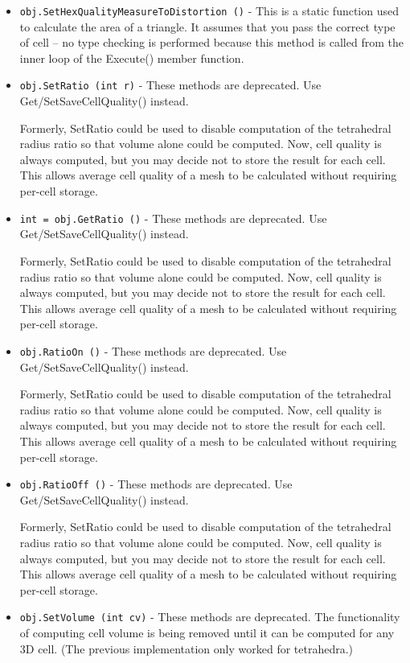 \begin{itemize}
\item  \verb|obj.SetHexQualityMeasureToDistortion ()| -  This is a static function used to calculate the area of a triangle.
 It assumes that you pass the correct type of cell -- no type checking is
 performed because this method is called from the inner loop of the Execute()
 member function.

\item  \verb|obj.SetRatio (int r)| -  These methods are deprecated. Use Get/SetSaveCellQuality() instead.

 Formerly, SetRatio could be used to disable computation
 of the tetrahedral radius ratio so that volume alone could be computed.
 Now, cell quality is always computed, but you may decide not
 to store the result for each cell.
 This allows average cell quality of a mesh to be
 calculated without requiring per-cell storage.

\item  \verb|int = obj.GetRatio ()| -  These methods are deprecated. Use Get/SetSaveCellQuality() instead.

 Formerly, SetRatio could be used to disable computation
 of the tetrahedral radius ratio so that volume alone could be computed.
 Now, cell quality is always computed, but you may decide not
 to store the result for each cell.
 This allows average cell quality of a mesh to be
 calculated without requiring per-cell storage.

\item  \verb|obj.RatioOn ()| -  These methods are deprecated. Use Get/SetSaveCellQuality() instead.

 Formerly, SetRatio could be used to disable computation
 of the tetrahedral radius ratio so that volume alone could be computed.
 Now, cell quality is always computed, but you may decide not
 to store the result for each cell.
 This allows average cell quality of a mesh to be
 calculated without requiring per-cell storage.

\item  \verb|obj.RatioOff ()| -  These methods are deprecated. Use Get/SetSaveCellQuality() instead.

 Formerly, SetRatio could be used to disable computation
 of the tetrahedral radius ratio so that volume alone could be computed.
 Now, cell quality is always computed, but you may decide not
 to store the result for each cell.
 This allows average cell quality of a mesh to be
 calculated without requiring per-cell storage.

\item  \verb|obj.SetVolume (int cv)| -  These methods are deprecated. The functionality of computing cell
 volume is being removed until it can be computed for any 3D cell.
 (The previous implementation only worked for tetrahedra.)


\end{itemize}
